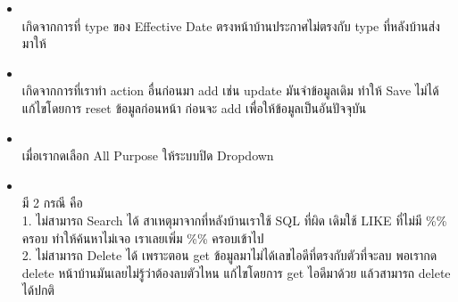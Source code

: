 \begin{itemize}
    \item \textbf{} \\
          เกิดจากการที่ type ของ Effective Date ตรงหน้าบ้านประกาศไม่ตรงกับ type ที่หลังบ้านส่งมาให้
    \item \textbf{} \\
          เกิดจากการที่เราทำ action อื่นก่อนมา add เช่น update มันจำข้อมูลเดิม ทำให้ Save ไม่ได้ แก้ไขโดยการ reset ข้อมูลก่อนหน้า ก่อนจะ add เพื่อให้ข้อมูลเป็นอันปัจจุบัน
    \item \textbf{} \\
          เมื่อเรากดเลือก All Purpose ให้ระบบปิด Dropdown
    \item \textbf{} \\
          มี 2 กรณี คือ \\
          1. ไม่สามารถ Search ได้ สาเหตุมาจากที่หลังบ้านเราใช้ SQL ที่ผิด เดิมใช้ LIKE ที่ไม่มี \%\% ครอบ ทำให้ค้นหาไม่เจอ เราเลยเพิ่ม \%\% ครอบเข้าไป \\ 
          2. ไม่สามารถ Delete ได้ เพราะตอน get ข้อมูลมาไม่ได้เลขไอดีที่ตรงกับตัวที่จะลบ พอเรากด delete หน้าบ้านมันเลยไม่รู้ว่าต้องลบตัวไหน แก้ไขโดยการ get ไอดีมาด้วย แล้วสามารถ delete ได้ปกติ
\end{itemize}

